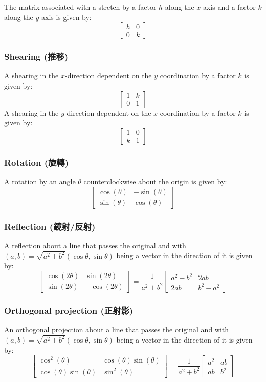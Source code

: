 \documentclass[a4paper,12pt]{report}
\begin{document}
The matrix associated with a stretch by a factor $h$ along the $x$-axis and a factor $k$ along the $y$-axis is given by:
\[\begin{bmatrix}
h & 0 \\
0 & k
\end{bmatrix}\]
\subsubsection{Shearing (推移)}
A shearing in the $x$-direction dependent on the $y$ coordination by a factor $k$ is given by:
\[\begin{bmatrix}
1 & k \\
0 & 1
\end{bmatrix}\]
A shearing in the $y$-direction dependent on the $x$ coordination by a factor $k$ is given by:
\[\begin{bmatrix}
1 & 0 \\
k & 1
\end{bmatrix}\]
\subsubsection{Rotation (旋轉)}
A rotation by an angle $\theta$ counterclockwise about the origin is given by:
\[\begin{bmatrix}
\cos(\theta) & -\sin(\theta) \\
\sin(\theta) & \cos(\theta)
\end{bmatrix}\]
\subsubsection{Reflection (鏡射/反射)}
A reflection about a line that passes the original and with $(a,b)=\sqrt{a^2+b^2}(\cos\theta,\sin\theta)$ being a vector in the direction of it is given by:
\[\begin{bmatrix}
\cos(2\theta) & \sin(2\theta) \\
\sin(2\theta) & -\cos(2\theta)
\end{bmatrix}=
\frac{1}{a^2+b^2}\begin{bmatrix}
a^2-b^2 & 2ab \\
2ab & b^2-a^2
\end{bmatrix}\]
\subsubsection{Orthogonal projection (正射影)}
An orthogonal projection about a line that passes the original and with $(a,b)=\sqrt{a^2+b^2}(\cos\theta,\sin\theta)$ being a vector in the direction of it is given by:
\[\begin{bmatrix}
\cos^2(\theta) & \cos(\theta)\sin(\theta) \\
\cos(\theta)\sin(\theta) & \sin^2(\theta)
\end{bmatrix}=
\frac{1}{a^2+b^2}\begin{bmatrix}
a^2 & ab \\
ab & b^2
\end{bmatrix}\]
\end{document}
